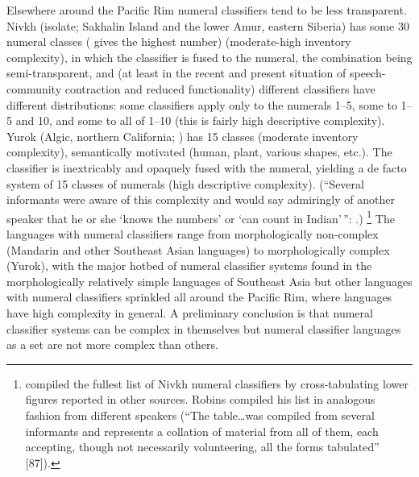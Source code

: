 \documentclass[output=collectionpaper]{langsci/langscibook}
\begin{document}
Elsewhere around the Pacific Rim numeral classifiers tend to be less transparent. Nivkh (isolate; Sakhalin Island and the lower Amur, eastern Siberia) has some 30 numeral classes (\citealt{Mattissen2003} gives the highest number) (moderate-high inventory complexity), in which the classifier is fused to the numeral, the combination being semi-transparent, and (at least in the recent and present situation of speech-community contraction and reduced functionality) different classifiers have different distributions: some classifiers apply only to the numerals 1--5, some to 1--5 and 10, and some to all of 1--10 (this is fairly high descriptive complexity). Yurok (Algic, northern California; \citealt[86--91]{Robins1958}) has 15 classes (moderate inventory complexity), semantically motivated (human, plant, various shapes, etc.). The classifier is inextricably and opaquely fused with the numeral, yielding a de facto system of 15 classes of numerals (high descriptive complexity). (``Several informants were aware of this complexity and would say admiringly of another speaker that he or she `knows the numbers' or `can count in Indian'\,'': \citealt[87n]{Robins1958}.)%
\footnote{%
\citet{Mattissen2003} compiled the fullest list of Nivkh numeral classifiers by cross-tabulating lower figures reported in other sources. Robins compiled his list in analogous fashion from different speakers (``The table\ldots was compiled from several informants and represents a collation of material from all of them, each accepting, though not necessarily volunteering, all the forms tabulated'' [87]).
} %
The languages with numeral classifiers range from morphologically non-complex (Mandarin and other Southeast Asian languages) to morphologically complex (Yurok), with the major hotbed of numeral classifier systems found in the morphologically relatively simple languages of Southeast Asia but other languages with numeral classifiers sprinkled all around the Pacific Rim, where languages have high complexity in general. A preliminary conclusion is that numeral classifier systems can be complex in themselves but numeral classifier languages as a set are not more complex than others.
\end{document}

